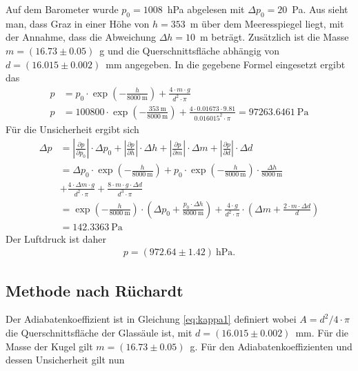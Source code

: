 \documentclass{article}
\begin{document}
Auf dem Barometer wurde $p_0=1008$~hPa abgelesen mit $\Delta p_0=20$~Pa. Aus \cite{graz} sieht man, dass Graz in einer Höhe von $h=353$~m über dem Meeresspiegel liegt, mit der Annahme, dass die Abweichung $\Delta h=10$~m beträgt. Zusätzlich ist die Masse $m=(16.73 \pm 0.05)$~g und die Querschnittsfläche abhängig von $d=(16.015 \pm 0.002)$~mm angegeben. In die gegebene Formel eingesetzt ergibt das
\begin{align}
p &= p_0 \cdot \exp\left(-\frac{h}{8000~\text{m}}\right) + \frac{4\cdot m\cdot g}{d^2\cdot \pi} \\
p &= 100800 \cdot \exp\left(-\frac{353~\text{m}}{8000~\text{m}}\right) + \frac{4\cdot 0.01673\cdot 9.81}{0.016015^2\cdot \pi} = 97263.6461~\text{Pa}
\end{align}
Für die Unsicherheit ergibt sich
\begin{align}
\Delta p &= \left| \frac{\partial p}{\partial p_0} \right| \cdot \Delta p_0 + \left| \frac{\partial p}{\partial h} \right| \cdot \Delta h+\left| \frac{\partial p}{\partial m} \right| \cdot \Delta m + \left| \frac{\partial p}{\partial d} \right| \cdot \Delta d  \\
&= \Delta p_0 \cdot \exp\left(-\frac{h}{8000~\text{m}}\right) +p_0\cdot\exp\left(-\frac{h}{8000~\text{m}}\right)\cdot \frac{\Delta h}{8000~\text{m}}
 \\
\nonumber &+ \frac{4\cdot \Delta m\cdot g}{d^2\cdot \pi} + \frac{8\cdot m\cdot g \cdot \Delta d}{d^3\cdot \pi} \\
&= \exp\left(-\frac{h}{8000~\text{m}}\right)\cdot \left( \Delta p_0 + \frac{p_0\cdot \Delta h}{8000~\text{m}}\right) + \frac{4\cdot g}{d^2\cdot \pi}\cdot \left(\Delta m + \frac{2\cdot m\cdot \Delta d}{d} \right) \\
&= 142.3363~\text{Pa}
\end{align}
Der Luftdruck ist daher
\begin{align}
p = (972.64 \pm 1.42)~\text{hPa}.
\end{align}
\subsection{Methode nach Rüchardt}


Der Adiabatenkoeffizient ist in Gleichung \eqref{eq:kappa1} definiert wobei $A=d^2/4\cdot \pi$ die Querschnittsfläche der Glassäule ist, mit $d=(16.015 \pm 0.002)$~mm. Für die Masse der Kugel gilt $m=(16.73 \pm 0.05)$~g. Für den Adiabatenkoeffizienten und dessen Unsicherheit gilt nun
\end{document}
